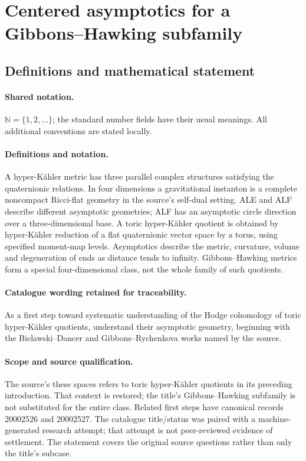 \documentclass[11pt]{article}
\begin{document}
\section{Centered asymptotics for a Gibbons--Hawking subfamily}\label{statement}

\subsection{Definitions and mathematical statement}

\paragraph{Shared notation.}$\mathbb N=\{1,2,\ldots\}$; the standard number fields have their usual meanings. All additional conventions are stated locally.


\paragraph{Definitions and notation.}A hyper-Kähler metric has three parallel complex structures satisfying the quaternionic relations. In four dimensions a gravitational instanton is a complete noncompact Ricci-flat geometry in the source’s self-dual setting. ALE and ALF describe different asymptotic geometries; ALF has an asymptotic circle direction over a three-dimensional base. A toric hyper-Kähler quotient is obtained by hyper-Kähler reduction of a flat quaternionic vector space by a torus, using specified moment-map levels. Asymptotics describe the metric, curvature, volume and degeneration of ends as distance tends to infinity. Gibbons--Hawking metrics form a special four-dimensional class, not the whole family of such quotients.

\paragraph{Catalogue wording retained for traceability.}
As a first step toward systematic understanding of the Hodge cohomology of toric hyper-Kähler quotients, understand their asymptotic geometry, beginning with the Bielawski--Dancer and Gibbons--Rychenkova works named by the source.
\paragraph{Scope and source qualification.}The source’s these spaces refers to toric hyper-Kähler quotients in its preceding introduction. That context is restored; the title’s Gibbons–Hawking subfamily is not substituted for the entire class. Related first steps have canonical records 20002526 and 20002527. The catalogue title/status was paired with a machine-generated research attempt; that attempt is not peer-reviewed evidence of settlement. The statement covers the original source questions rather than only the title’s subcase.
\end{document}
